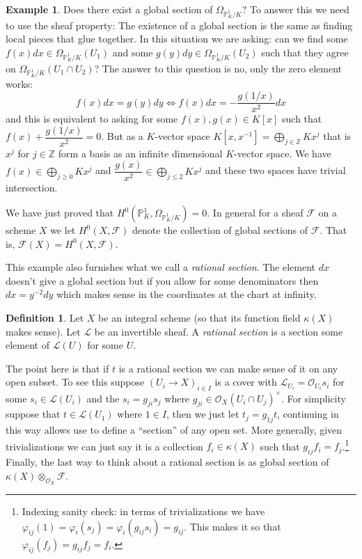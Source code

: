 \documentclass[12pt]{article}
\numberwithin{equation}{section}
\theoremstyle{definition}
\newtheorem{definition}[theorem]{Definition}
\newtheorem{example}[theorem]{Example}
\theoremstyle{remark}
\newcommand{\ZZ}{\mathbb{Z}}
\newcommand{\Ocal}{\mathcal{O}}
\newcommand{\PP}{\mathbb{P}}
\newcommand{\Lcal}{\mathcal{L}}
\newcommand{\Fcal}{\mathcal{F}}
\begin{document}
\begin{example}
	Does there exist a global section of $\Omega_{\PP^1_K/K}?$ 
	To answer this we need to use the sheaf property:
	The existence of a global section is the same as finding local pieces that glue together. In this situation we are asking: can we find some $f(x) dx \in \Omega_{\PP^1_K/K}(U_1)$ and some $g(y) dy \in \Omega_{\PP^1_K/K}(U_2)$ such that they agree on $\Omega_{\PP^1_K/K}(U_1\cap U_2)$?
	The answer to this question is no, only the zero element works:
		$$f(x)dx = g(y) dy \iff f(x)dx =-\dfrac{g(1/x)}{x^2} dx$$
	and this is equivalent to asking for some $f(x),g(x) \in K[x]$ such that $f(x) + \dfrac{g(1/x)}{x^2}=0$.
	But as a $K$-vector space $K[x,x^{-1}] = \bigoplus_{j\in \ZZ} K x^j$ that is $x^j$ for $j\in \ZZ$ form a basis as an infinite dimensional $K$-vector space.
	We have $f(x) \in \bigoplus_{j \geq 0} Kx^j$ and $\dfrac{g(x)}{x^2} \in \bigoplus_{j\leq 2 } K x^j$ and these two spaces have trivial intersection.
\end{example}

We have just proved that $H^0(\PP^1_K,\Omega_{\PP^1_K/K})=0$. 
In general for a sheaf $\Fcal$ on a scheme $X$ we let $H^0(X,\Fcal)$ denote the collection of global sections of $\Fcal$. That is, $\Fcal(X) = H^0(X,\Fcal)$.

This example also furnishes what we call a \emph{rational section}. 
The element $dx$ doesn't give a global section but if you allow for some denominators then $dx=y^{-2}dy$ which makes sense in the coordinates at the chart at infinity.

\begin{definition}
Let $X$ be an integral scheme (so that its function field $\kappa(X)$ makes sense).
Let $\Lcal$ be an invertible sheaf. 
A \emph{rational section} is a section some element of $\Lcal(U)$ for some $U$. 
\end{definition}
The point here is that if $t$ is a rational section we can make sense of it on any open subset. 
To see this suppose $(U_i \to X)_{i\in I}$ is a cover with $\Lcal_{U_i} = \Ocal_{U_i} s_i$ for some $s_i \in \Lcal(U_i)$ and the $s_i = g_{ji} s_j$ where $g_{ji} \in \Ocal_X(U_i \cap U_j)^{\times}$. 
For simplicity suppose that $t \in \Lcal(U_1)$ where $1\in I$, then we just let $t_{j} = g_{1j}t$, continuing in this way allows use to define a ``section'' of any open set.
More generally, given trivializations we can just say it is a collection $f_i \in \kappa(X)$ such that $ g_{ij}f_i=f_j$.\footnote{Indexing sanity check: in terms of trivializations we have $\varphi_{ij}(1) = \varphi_i(s_j) =  \varphi_i(g_{ij}s_i) = g_{ij}$.  This makes it so that $\varphi_{ij}(f_j) = g_{ij}f_j = f_i.$}
Finally, the last way to think about a rational section is as global section of $\kappa(X) \otimes_{\Ocal_X} \Fcal$.
\end{document}
